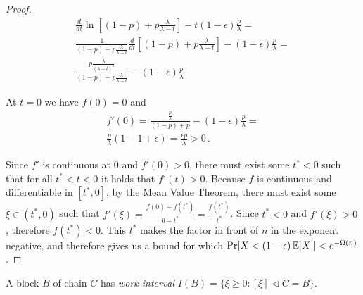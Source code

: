 \begin{proof}
  \begin{align*}
    \frac{d}{dt} \ln\left[(1 - p) + p\frac{\lambda}{\lambda - t}\right] - t(1 - \epsilon)\frac{p}{\lambda} = \\
    \frac{1}{(1 - p) + p\frac{\lambda}{\lambda - t}} \frac{d}{dt} \left[(1 - p) + p\frac{\lambda}{\lambda - t}\right] - (1 - \epsilon)\frac{p}{\lambda} = \\
    \frac{p\frac{\lambda}{(\lambda - t)^2}}{(1 - p) + p\frac{\lambda}{\lambda - t}} - (1 - \epsilon)\frac{p}{\lambda}
  \end{align*}

  At $t = 0$ we have $f(0) = 0$ and
  \begin{align*}
    f'(0) = \frac{\frac{p}{\lambda}}{(1 - p) + p} - (1 - \epsilon)\frac{p}{\lambda} =\\
    \frac{p}{\lambda}(1 - 1 + \epsilon) = \frac{\epsilon p}{\lambda} > 0\,.
  \end{align*}

  Since $f'$ is continuous at $0$ and $f'(0)>  0$, there must exist some $t^* < 0$ such that for all
  $t^* < t < 0$ it holds that $f'(t) > 0$. Because $f$ is continuous and differentiable in $[t^*, 0]$,
  by the Mean Value Theorem, there must exist some $\xi \in (t^*, 0)$ such that
  $f'(\xi) = \frac{f(0) - f(t^*)}{0 - t^*} = \frac{f(t^*)}{t^*}$.
  Since $t^* < 0$ and $f'(\xi) > 0$, therefore $f(t^*) < 0$.
  This $t^*$ makes the factor in front of $n$ in the exponent negative, and therefore
  gives us a bound for which $\Pr[X < (1 - \epsilon)\mathop{{}\mathbb{E}}[X]] < e^{-\Omega(n)}$.
  \Qed
\end{proof}

\begin{definition}
  A block $B$ of chain $C$ has \emph{work interval}
  $I(B) = \{\xi \geq 0: [\xi] \lhd C = B\}$.
\end{definition}


